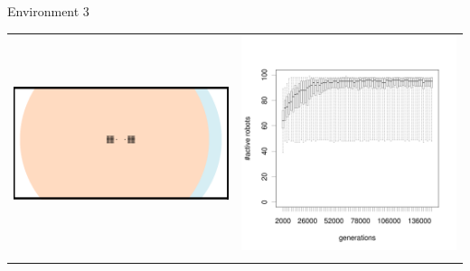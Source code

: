 \documentclass[8pt, handout=show,notes=show]{beamer}
\begin{document}
\begin{frame}{Environment 3}

\begin{table}[H]
\centering
\begin{tabular}{cc}
\includegraphics[width=\imgSize]{../images/5StaticEnv/environments/staticEnv3}&\includegraphics[width=\imgSize]{../images/5StaticEnv/alive_staticEnv3}\\
\newline

\end{tabular}
\end{table}
\end{frame}
\end{document}
